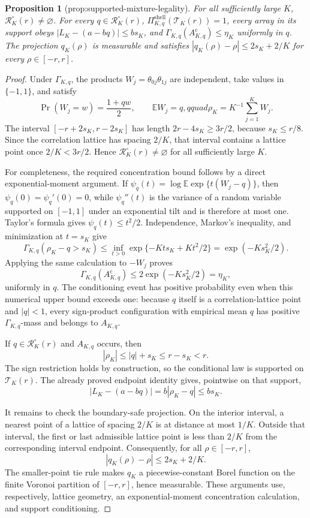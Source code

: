 \documentclass{article}
\newtheorem{proposition}{Proposition}
\begin{document}
\begin{proposition}[prop:supported-mixture-legality]\label{prop:supported-mixture-legality}
For all sufficiently large \(K\), \(\mathcal R_K^{\circ}(r)\neq\varnothing\). For every \(q\in\mathcal R_K^{\circ}(r)\), \(\Pi_{K,q}^{\mathrm{shell}}(\mathcal T_K(r))=1\), every array in its support obeys \(|L_K-(a-bq)|\le b s_K\), and \(\Gamma_{K,q}(A_{K,q}^{\mathrm c})\le\eta_K\) uniformly in \(q\). The projection \(q_K(\rho)\) is measurable and satisfies \(|q_K(\rho)-\rho|\le 2s_K+2/K\) for every \(\rho\in[-r,r]\).
\end{proposition}
\begin{proof}
Under \(\Gamma_{K,q}\), the products \(W_j=\theta_{0j}\theta_{1j}\) are independent, take values in \(\{-1,1\}\), and satisfy
\[
 \Pr(W_j=w)=\frac{1+qw}{2},\qquad \mathbb EW_j=q,qquad
 \rho_K=K^{-1}\sum_{j=1}^K W_j.
\]
The interval \([-r+2s_K,r-2s_K]\) has length \(2r-4s_K\ge3r/2\), because \(s_K\le r/8\).  Since the correlation lattice has spacing \(2/K\), that interval contains a lattice point once \(2/K<3r/2\).  Hence \(\mathcal R_K^\circ(r)\ne\varnothing\) for all sufficiently large \(K\).

For completeness, the required concentration bound follows by a direct exponential-moment argument.  If
\(\psi_q(t)=\log\mathbb E\exp\{t(W_j-q)\}\), then \(\psi_q(0)=\psi_q'(0)=0\), while \(\psi_q''(t)\) is the variance of a random variable supported on \([-1,1]\) under an exponential tilt and is therefore at most one.  Taylor's formula gives \(\psi_q(t)\le t^2/2\).  Independence, Markov's inequality, and minimization at \(t=s_K\) give
\[
 \Gamma_{K,q}(\rho_K-q>s_K)
 \le \inf_{t>0}\exp\{-Kt s_K+Kt^2/2\}
 =\exp(-Ks_K^2/2).
\]
Applying the same calculation to \(-W_j\) proves
\[
 \Gamma_{K,q}(A_{K,q}^{\mathrm c})
 \le2\exp(-Ks_K^2/2)=\eta_K,
\]
uniformly in \(q\).  The conditioning event has positive probability even when this numerical upper bound exceeds one: because \(q\) itself is a correlation-lattice point and \(|q|<1\), every sign-product configuration with empirical mean \(q\) has positive \(\Gamma_{K,q}\)-mass and belongs to \(A_{K,q}\).

If \(q\in\mathcal R_K^\circ(r)\) and \(A_{K,q}\) occurs, then
\[
 |\rho_K|\le |q|+s_K\le r-s_K<r.
\]
The sign restriction holds by construction, so the conditional law is supported on \(\mathcal T_K(r)\).  The already proved endpoint identity gives, pointwise on that support,
\[
 |L_K-(a-bq)|=b|\rho_K-q|\le bs_K.
\]

It remains to check the boundary-safe projection.  On the interior interval, a nearest point of a lattice of spacing \(2/K\) is at distance at most \(1/K\).  Outside that interval, the first or last admissible lattice point is less than \(2/K\) from the corresponding interval endpoint.  Consequently, for all \(\rho\in[-r,r]\),
\[
 |q_K(\rho)-\rho|\le2s_K+2/K.
\]
The smaller-point tie rule makes \(q_K\) a piecewise-constant Borel function on the finite Voronoi partition of \([-r,r]\), hence measurable.  These arguments use, respectively, lattice geometry, an exponential-moment concentration calculation, and support conditioning.
\end{proof}
\end{document}
